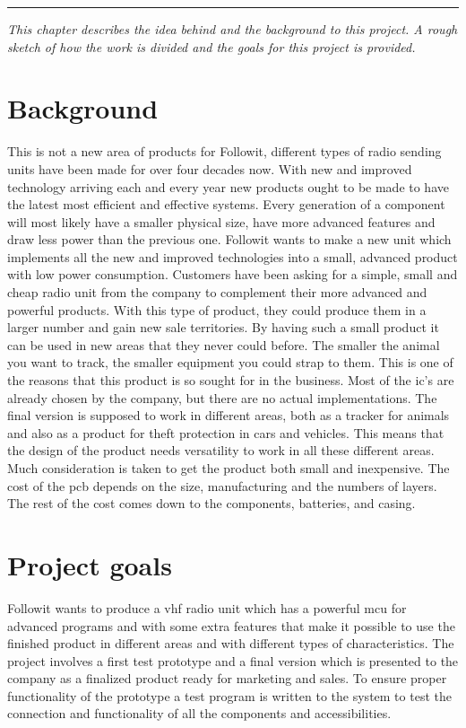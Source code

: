 
\vspace{-10ex}%
\rule{\textwidth}{0.3pt}
\vspace{5ex}

\textit{ 
This chapter describes the idea behind and the background to this project. A rough sketch of how the work is divided and the goals for this project is provided.
}
\vspace{5ex}

\section{Background}
This is not a new area of products for Followit, different types of radio sending units have been made for over four decades now. 
With new and improved technology arriving each and every year new products ought to be made to have the latest most efficient and effective systems. Every generation of a component will most likely have a smaller physical size, have more advanced features and draw less power than the previous one. Followit wants to make a new unit which implements all the new and improved technologies into a small, advanced product with low power consumption. 
Customers have been asking for a simple, small and cheap radio unit from the company to complement their more advanced and powerful products. With this type of product, they could produce them in a larger number and gain new sale territories. By having such a small product it can be used in new areas that they never could before. The smaller the animal you want to track, the smaller equipment you could strap to them. This is one of the reasons that this product is so sought for in the business. 
\newline 
Most of the \gls{ic}'s are already chosen by the company, but there are no actual implementations. The final version is supposed to work in different areas, both as a tracker for animals and also as a product for theft protection in cars and vehicles. This means that the design of the product needs versatility to work in all these different areas.  
Much consideration is taken to get the product both small and inexpensive. The cost of the \gls{pcb} depends on the size, manufacturing and the numbers of layers. The rest of the cost comes down to the components, batteries, and casing.    \\

\section{Project goals}
Followit wants to produce a \gls{vhf} radio unit which has a powerful \gls{mcu} for advanced programs and with some extra features that make it possible to use the finished product in different areas and with different types of characteristics. The project involves a first test prototype and a final version which is presented to the company as a finalized product ready for marketing and sales. To ensure proper functionality of the prototype a test program is written to the system to test the connection and functionality of all the components and accessibilities. 

